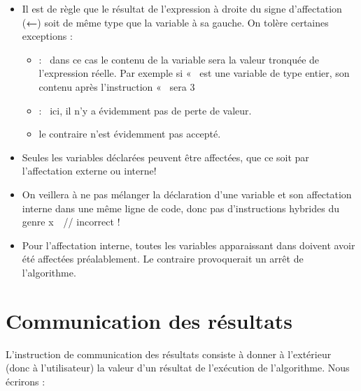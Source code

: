 			\begin{itemize}
			\item
				Il est de règle que le résultat de l’expression à droite du signe
				d’affectation ({\textsf{\textbf{←}}}) soit de
				même type que la variable à sa gauche. On tolère certaines exceptions
				:
				\begin{itemize}
				\item
					 : \ dans ce cas le contenu de la variable sera la valeur tronquée
					de l’expression réelle. Par exemple si «~ est
					une variable de type entier, son contenu après l’instruction
					«~ sera 3
				\item 
					 : \ ici, il n'y a évidemment pas de perte de
					valeur.
				\item 
					 le contraire n'est évidemment pas
					accepté.
				\end{itemize}
			\item 
				Seules les variables déclarées peuvent être affectées, que ce soit par
				l’affectation externe ou interne!
			\item 
				On veillera à ne pas mélanger la déclaration d’une variable et son
				affectation interne dans une même ligne de code, donc pas
				d’instructions hybrides du genre \textsf{x}\textstyleCodeInsr{
				}\ \ // incorrect !
			\item 
				Pour l’affectation interne, toutes les variables apparaissant dans
				 doivent avoir été affectées
				préalablement. Le contraire provoquerait un arrêt de l’algorithme.
			\end{itemize}
			
	\section{Communication des résultats}

		L’instruction de communication des résultats consiste à donner à
		l’extérieur (donc à l’utilisateur) la valeur d’un résultat de
		l’exécution de l’algorithme. Nous écrirons :

